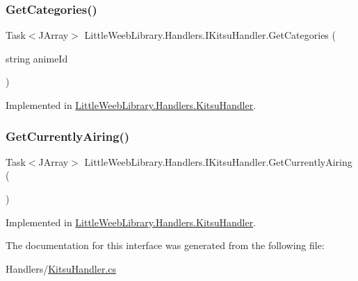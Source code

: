\mbox{\label{interface_little_weeb_library_1_1_handlers_1_1_i_kitsu_handler_a731b56ca79910b6b1d7b2218c34e3156}} 
\subsubsection{\texorpdfstring{Get\+Categories()}{GetCategories()}}
{\footnotesize\ttfamily Task$<$J\+Array$>$ Little\+Weeb\+Library.\+Handlers.\+I\+Kitsu\+Handler.\+Get\+Categories (\begin{DoxyParamCaption}\item[{string}]{anime\+Id }\end{DoxyParamCaption})}



Implemented in \mbox{\hyperlink{class_little_weeb_library_1_1_handlers_1_1_kitsu_handler_a8d6a49dd26f66dd33ea2e2b4e9b330cb}{Little\+Weeb\+Library.\+Handlers.\+Kitsu\+Handler}}.

\mbox{\label{interface_little_weeb_library_1_1_handlers_1_1_i_kitsu_handler_a644c9e4caf1db5de18a78fe03b33e278}} 
\subsubsection{\texorpdfstring{Get\+Currently\+Airing()}{GetCurrentlyAiring()}}
{\footnotesize\ttfamily Task$<$J\+Array$>$ Little\+Weeb\+Library.\+Handlers.\+I\+Kitsu\+Handler.\+Get\+Currently\+Airing (\begin{DoxyParamCaption}{ }\end{DoxyParamCaption})}



Implemented in \mbox{\hyperlink{class_little_weeb_library_1_1_handlers_1_1_kitsu_handler_af733f442659b7789588da55b00c065c4}{Little\+Weeb\+Library.\+Handlers.\+Kitsu\+Handler}}.



The documentation for this interface was generated from the following file\+:\begin{DoxyCompactItemize}
\item 
Handlers/\mbox{\hyperlink{_kitsu_handler_8cs}{Kitsu\+Handler.\+cs}}\end{DoxyCompactItemize}
